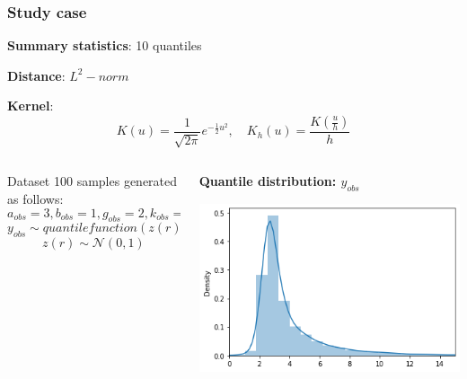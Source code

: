 \documentclass{beamer}
\begin{document}
	
	
	\begin{frame}
		\frametitle{Study case}
		
		\textbf{Summary statistics}: 10 quantiles
			
		\textbf{Distance}: $ L^2-norm $
			
		\textbf{Kernel}: 
		$$
		K(u) = 
		\frac{1}{\sqrt{2\pi}} e^{-\frac{1}{2}u^2}, 
		\quad K_h(u) 
		= \frac{K(\frac u h)}{h}
		$$
		
	\begin{columns}
		\begin{column}{0.6\textwidth}
		\begin{block}{Dataset}
			100 samples generated as follows:
			$$a_{obs}= 3 ,
			 b_{obs}= 1 ,
			 g_{obs}=2 ,
			 k_{obs}=0.5 $$
			$$ y_{obs} \sim quantilefunction(z(r), \theta_{obs})$$
			$$ z(r) \sim \mathcal{N}(0,1)$$
			
		\end{block}
		\end{column}
	\hspace{-7mm}
	\begin{column}{0.3\textwidth}
		
			\begin{center}
				{\scriptsize \textbf{\space Quantile distribution: $y_{obs}$}}
					
				\includegraphics[width=1.2\columnwidth]{immagini_mario/density_quantile}
			\end{center}
		\end{column}
	
	\end{columns}
		
	\end{frame}
\end{document}

